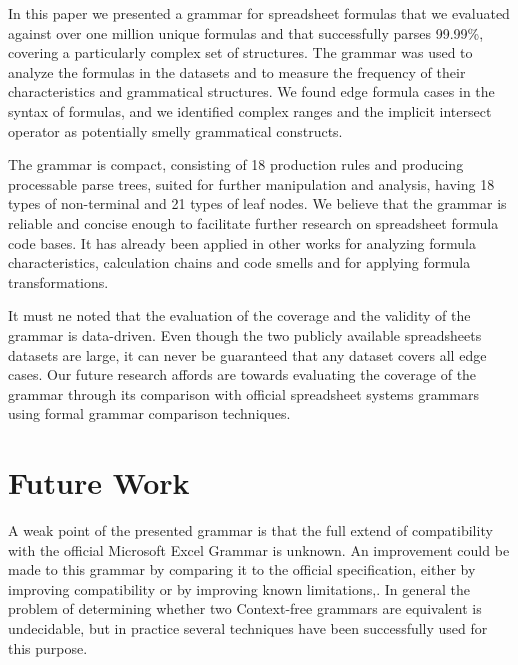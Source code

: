 \documentclass[conference]{IEEEtran}
\begin{document}
In this paper we presented a grammar for spreadsheet formulas that we evaluated against over one million unique formulas and that successfully parses 99.99\%, covering a particularly complex set of structures. The grammar was used to analyze the formulas in the datasets and to measure the frequency of their characteristics and grammatical structures. We found edge formula cases in the syntax of formulas, and we identified complex ranges and the implicit intersect operator as potentially smelly grammatical constructs.

The grammar is compact, consisting of 18 production rules and producing processable parse trees, suited for further manipulation and analysis, having 18 types of non-terminal and 21 types of leaf nodes. We believe that the grammar is reliable and concise enough to facilitate further research on spreadsheet formula code bases. It has already been applied in other works for analyzing formula characteristics, calculation chains and code smells and for applying formula transformations.

It must ne noted that the evaluation of the coverage and the validity of the grammar is data-driven. Even though the two publicly available spreadsheets datasets are large, it can never be guaranteed that any dataset covers all edge cases. Our future research affords are towards evaluating the coverage of the grammar through its comparison with official spreadsheet systems grammars using formal grammar comparison techniques.

\section{Future Work}

A weak point of the presented grammar is that the full extend of compatibility with the official Microsoft Excel Grammar is unknown.
An improvement could be made to this grammar by comparing it to the official specification, either by improving compatibility or by improving known limitations,.
In general the problem of determining whether two Context-free grammars are equivalent is undecidable, but in practice several techniques have been successfully used for this purpose.




\end{document}
